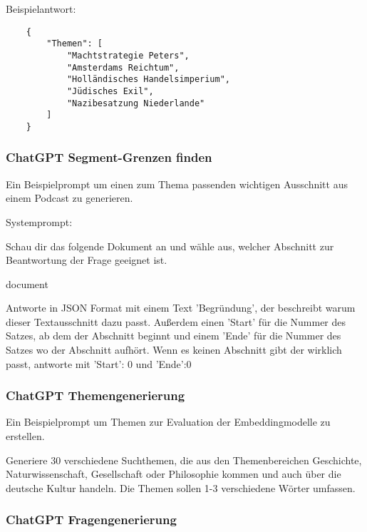 Beispielantwort:

\begin{verbatim}
    {
        "Themen": [
            "Machtstrategie Peters",
            "Amsterdams Reichtum",
            "Holländisches Handelsimperium",
            "Jüdisches Exil",
            "Nazibesatzung Niederlande"
        ]
    }
\end{verbatim}


\label{ch:chatgpt-boundaries}
\subsubsection*{ChatGPT Segment-Grenzen finden}
Ein Beispielprompt um einen zum Thema passenden wichtigen Ausschnitt aus einem Podcast zu generieren.

Systemprompt:

\begin{itshape}
    Schau dir das folgende Dokument an und wähle aus, welcher Abschnitt zur Beantwortung der Frage geeignet ist.

    {document}

    Antworte in JSON Format mit einem Text 'Begründung', der beschreibt warum dieser Textausschnitt dazu passt. 
    Außerdem einen 'Start' für die Nummer des Satzes, ab dem der Abschnitt beginnt und 
    einem 'Ende' für die Nummer des Satzes wo der Abschnitt aufhört.
    Wenn es keinen Abschnitt gibt der wirklich passt, antworte mit 'Start': 0 und 'Ende':0

\end{itshape}


\label{ch:chatgpt-topicgeneration}
\subsubsection*{ChatGPT Themengenerierung}

Ein Beispielprompt um Themen zur Evaluation der Embeddingmodelle zu erstellen.

\begin{itshape}
Generiere 30 verschiedene Suchthemen, die aus den Themenbereichen Geschichte, Naturwissenschaft, Gesellschaft oder Philosophie kommen und auch über die deutsche Kultur handeln.
Die Themen sollen 1-3 verschiedene Wörter umfassen.
\end{itshape}

\label{ch:chatgpt-questiongeneration}

\subsubsection*{ChatGPT Fragengenerierung}


